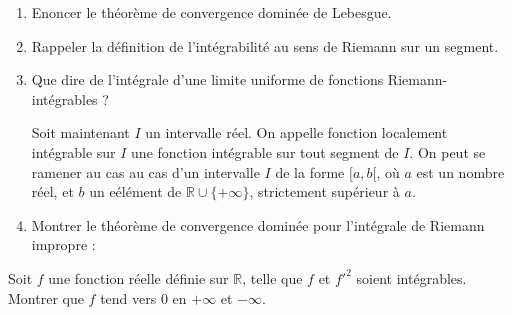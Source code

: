 \begin{exer}
\begin{enumerate}
\item Enoncer le th\'eor\`eme de convergence domin\'ee de Lebesgue.
\item Rappeler la d\'efinition de l'int\'egrabilit\'e au sens de Riemann sur un segment.
\item Que dire de l'int\'egrale d'une limite uniforme de fonctions Riemann-int\'egrables ?

\medskip
Soit maintenant $I$ un intervalle r\'eel. On appelle fonction localement int\'egrable sur $I$ une fonction int\'egrable sur tout segment de $I$. %
On peut se ramener au cas au cas d'un intervalle $I$ de la forme $[a,b[$, o\`u $a$ est un nombre r\'eel, et $b$ un e\'el\'ement de $\mathbb{R}\cup\{+\infty\}$, strictement sup\'erieur \`a $a$.
\item Montrer le th\'eor\`eme de convergence dominée pour l'intégrale de Riemann impropre :

\medskip
{}
\end{enumerate}
\end{exer}

\begin{exer}
Soit $f$ une fonction réelle définie sur $\mathbb{R}$, telle que $f$ et $f'^2$ soient intégrables.\\
Montrer que $f$ tend vers $0$ en $+ \infty$ et $- \infty$.
\end{exer}